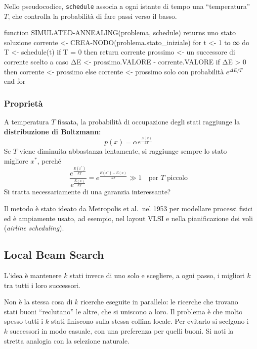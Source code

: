 \documentclass[a4paper, 11pt, oneside]{book}
\theoremstyle{definition}
\begin{document}
    Nello pseudocodice, \texttt{schedule} associa a ogni istante di tempo una
    ``temperatura'' $T$, che controlla la probabilit\`a di fare passi verso il basso.

\begin{codice}
function SIMULATED-ANNEALING(problema, schedule) returns uno stato soluzione
    corrente <- CREA-NODO(problema.stato_iniziale)
    for t <- 1 to ∞ do
        T <- schedule(t)
        if T = 0 then return corrente
        prossimo <- un successore di corrente scelto a caso
        ΔE <- prossimo.VALORE - corrente.VALORE
        if ΔE > 0 then corrente <- prossimo
        else corrente <- prossimo solo con probabilità $e^{\Delta E / T}$
    end for
\end{codice}

    \subsubsection*{Propriet\`a}
    A temperatura $T$ fissata, la probabilit\`a di occupazione degli stati raggiunge la
    \textbf{distribuzione di Boltzmann}:
    \[
        p(x) = \alpha e^{\frac{E(x)}{kT}}
    \]
    Se $T$ viene diminuita abbastanza lentamente, si raggiunge sempre lo stato migliore
    $x^*$, perch\'e
    \[
        \frac{e^{\frac{E(x^*)}{kT}}}{e^{\frac{E(x)}{kT}}} = e^{\frac{E(x^*) - E(x)}{kT}} \gg 1
        \quad \text{per } T \text{ piccolo}
    \]
    Si tratta necessariamente di una garanzia interessante?

    Il metodo \`e stato ideato da Metropolis et al.\ nel 1953 per modellare processi fisici
    ed \`e ampiamente usato, ad esempio, nel layout VLSI e nella pianificazione dei voli
    (\emph{airline scheduling}).

    \subsection{Local Beam Search}
    L'idea \`e mantenere $k$ stati invece di uno solo e scegliere, a ogni passo, i migliori
    $k$ tra tutti i loro successori.

    Non \`e la stessa cosa di $k$ ricerche eseguite in parallelo: le ricerche che trovano
    stati buoni ``reclutano'' le altre, che si uniscono a loro. Il problema \`e che molto
    spesso tutti i $k$ stati finiscono sulla stessa collina locale. Per evitarlo si scelgono
    i $k$ successori in modo casuale, con una preferenza per quelli buoni. Si noti la stretta
    analogia con la selezione naturale.
\end{document}
